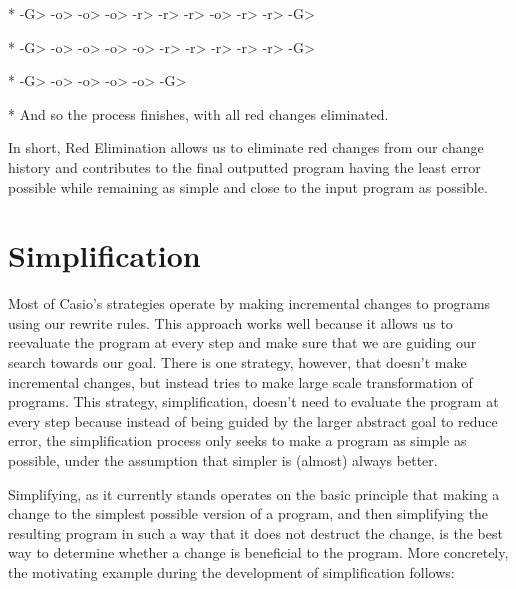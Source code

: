 \documentclass{article}
\begin{document}
       	      	    	     *
-G> -o> -o> -o> -r> -r> -r> -o> -r> -r> -G>

    	    	    	    	    	 *
-G> -o> -o> -o> -o> -r> -r> -r> -r> -r> -G>

    	    	     *
-G> -o> -o> -o> -o> -G>


* And so the process finishes, 
with all red changes eliminated.

In short, 
Red Elimination allows us to eliminate
 red changes from our change history 
and contributes to the final outputted 
program having the least error possible 
while remaining as simple 
and close to the input program 
as possible.

\section{Simplification}

Most of Casio's strategies 
operate by making incremental changes 
to programs using our rewrite rules. 
This approach works well 
because it allows us to reevaluate the program 
at every step 
and make sure that we are guiding our search 
towards our goal. 
There is one strategy, however, 
that doesn't make incremental changes, 
but instead tries to make 
large scale transformation of programs. 
This strategy, simplification, 
doesn't need to evaluate 
the program at every step 
because instead of being guided 
by the larger abstract goal 
to reduce error, 
the simplification process only seeks 
to make a program as simple as possible, 
under the assumption that 
simpler is (almost) always better.

Simplifying, 
as it currently stands 
operates on the basic principle 
that making a change to the 
simplest possible version of a program, 
and then simplifying the resulting program 
in such a way that 
it does not destruct the change, 
is the best way to determine 
whether a change is beneficial 
to the program. 
More concretely, 
the motivating example during 
the development of simplification follows:
\end{document}
